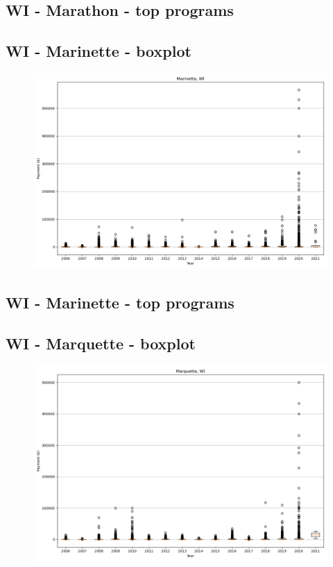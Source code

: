 \subsection*{WI - Marathon - top programs}

\newpage
\subsection*{WI - Marinette - boxplot}
\begin{figure}[h]
\centering
\includegraphics[width=7in]{../output/boxplots/counties/Marinette-WI_boxplot.png}
\end{figure}


\subsection*{WI - Marinette - top programs}

\newpage
\subsection*{WI - Marquette - boxplot}
\begin{figure}[h]
\centering
\includegraphics[width=7in]{../output/boxplots/counties/Marquette-WI_boxplot.png}
\end{figure}


